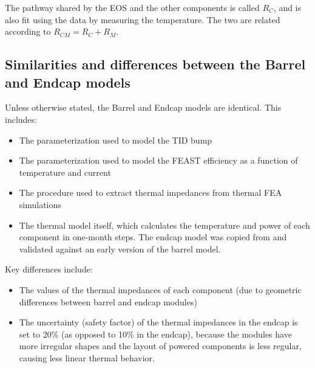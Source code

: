 The pathway shared by the EOS and the other components is called $R_{C}$, and is also fit using the
data by measuring the temperature. The two are related according to $R_{CM} = R_C + R_M$.

\subsection{Similarities and differences between the Barrel and Endcap models}

Unless otherwise stated, the Barrel and Endcap models are identical. This includes:
\begin{itemize}
  \item The parameterization used to model the TID bump
  \item The parameterization used to model the FEAST efficiency as a function of temperature 
    and current
  \item The procedure used to extract thermal impedances from thermal FEA simulations
  \item The thermal model itself, which calculates the temperature and power of each component in 
    one-month steps. The endcap model was copied from and validated against an early version
    of the barrel model.
\end{itemize}

Key differences include:
\begin{itemize}
  \item The values of the thermal impedances of each component (due to geometric differences between
    barrel and endcap modules)
  \item The uncertainty (safety factor) of the thermal impedances in the endcap is set to 20\% (as
    opposed to 10\% in the endcap), because the modules have more irregular shapes and the layout of
    powered components is less regular, causing less linear thermal behavior.
\end{itemize}
